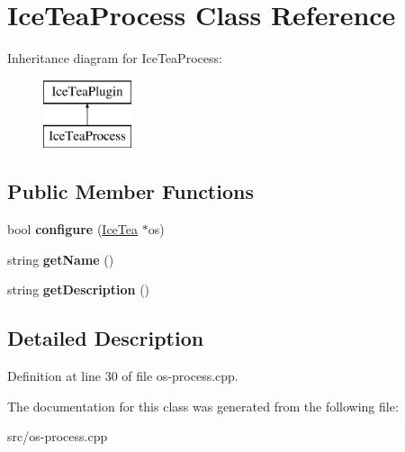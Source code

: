 \hypertarget{class_ice_tea_process}{}\section{Ice\+Tea\+Process Class Reference}
\label{class_ice_tea_process}
Inheritance diagram for Ice\+Tea\+Process\+:\begin{figure}[H]
\begin{center}
\leavevmode
\includegraphics[height=2.000000cm]{class_ice_tea_process}
\end{center}
\end{figure}
\subsection*{Public Member Functions}
\begin{DoxyCompactItemize}
\item 
bool {\bfseries configure} (\hyperlink{class_ice_tea}{Ice\+Tea} $\ast$os)\hypertarget{class_ice_tea_process_a55f02dba51b089cae2c4adda5d46b112}{}\label{class_ice_tea_process_a55f02dba51b089cae2c4adda5d46b112}

\item 
string {\bfseries get\+Name} ()\hypertarget{class_ice_tea_process_a7394db5efa9b8d89b1d4885e1cf137b4}{}\label{class_ice_tea_process_a7394db5efa9b8d89b1d4885e1cf137b4}

\item 
string {\bfseries get\+Description} ()\hypertarget{class_ice_tea_process_a4e85bc35d4a9f0c78a26f54f7d3f9646}{}\label{class_ice_tea_process_a4e85bc35d4a9f0c78a26f54f7d3f9646}

\end{DoxyCompactItemize}


\subsection{Detailed Description}


Definition at line 30 of file os-\/process.\+cpp.



The documentation for this class was generated from the following file\+:\begin{DoxyCompactItemize}
\item 
src/os-\/process.\+cpp\end{DoxyCompactItemize}
